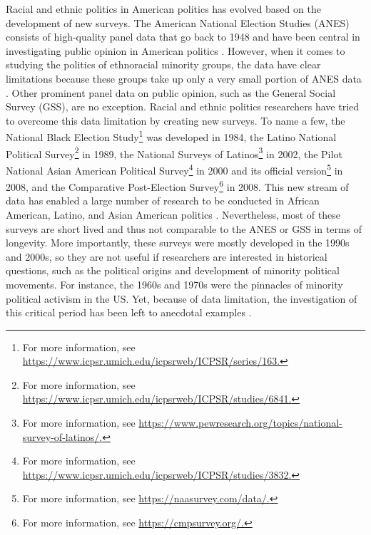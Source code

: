 \documentclass[12 pt]{article}
\begin{document}
Racial and ethnic politics in American politics has evolved based on the development of new surveys. The American National Election Studies (ANES) consists of high-quality panel data that go back to 1948 and have been central in investigating public opinion in American politics \citep{campbell1980american, zaller1992nature, bartels1999panel}. However, when it comes to studying the politics of ethnoracial minority groups, the data have clear limitations because these groups take up only a very small portion of ANES data \citep{conway2004politics}. Other prominent panel data on public opinion, such as the General Social Survey (GSS), are no exception. Racial and ethnic politics researchers have tried to overcome this data limitation by creating new surveys. To name a few, the National Black Election Study\footnote{For more information, see \url{https://www.icpsr.umich.edu/icpsrweb/ICPSR/series/163.}} was developed in 1984, the Latino National Political Survey\footnote{For more information, see \url{https://www.icpsr.umich.edu/icpsrweb/ICPSR/studies/6841.}} in 1989, the National Surveys of Latinos\footnote{For more information, see \url{https://www.pewresearch.org/topics/national-survey-of-latinos/.}} in 2002, the Pilot National Asian American Political Survey\footnote{For more information, see \url{https://www.icpsr.umich.edu/icpsrweb/ICPSR/studies/3832.}} in 2000 and its official version\footnote{For more information, see \url{https://naasurvey.com/data/.}} in 2008, and the Comparative Post-Election Survey\footnote{For more information, see \url{https://cmpsurvey.org/.}} in 2008. This new stream of data has enabled a large number of research to be conducted in African American, Latino, and Asian American politics \citep{gurin1990hope, tate1993protest, dawson1994behind, fraga2011latinos, wong2011asian, mcclain2018can}. Nevertheless, most of these surveys are short lived and thus not comparable to the ANES or GSS in terms of longevity. More importantly, these surveys were mostly developed in the 1990s and 2000s, so they are not useful if researchers are interested in historical questions, such as the political origins and development of minority political movements. For instance, the 1960s and 1970s were the pinnacles of minority political activism in the US. Yet, because of data limitation, the investigation of this critical period has been left to anecdotal examples \citep{munoz1989youth, wei_asian_1993, joseph2006black, maeda2012rethinking, ishizuka2016serve, linder2018text}. 
\end{document}
